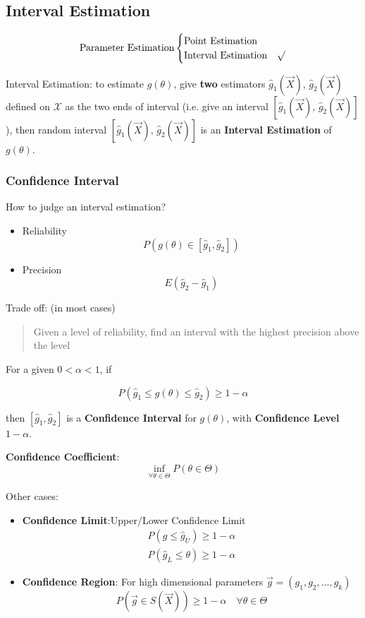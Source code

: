 \subsection{Interval Estimation}\label{SectionIntervalEstimation}
\[
    \text{Parameter Estimation}\begin{cases}
        \text{Point Estimation}& \\
        \text{Interval Estimation}& \surd
    \end{cases}    
\]

    Interval Estimation: to estimate $g(\theta)$, give \textbf{two} estimators $\hat{g}_1(\vec{X}),\, \hat{g}_2(\vec{X})$ defined on $\mathscr{X}$ as the two ends of interval (i.e. give an interval $[\hat{g}_1(\vec{X}),\, \hat{g}_2(\vec{X})]$), then random interval $[\hat{g}_1(\vec{X}),\, \hat{g}_2(\vec{X})]$ is an \textbf{Interval Estimation} of $g(\theta)$.

    \subsubsection{Confidence Interval}\label{SubSectionConfidenceInterval}
    How to judge an interval estimation?
    \begin{itemize}
        \item Reliability
        \[P(g(\theta)\in[\hat{g}_1,\hat{g}_2])\]
        \item Precision
        \[E(\hat{g}_2-\hat{g}_1)\]
    \end{itemize}

    Trade off: (in most cases)
    \begin{quote}
        Given a level of reliability, find an interval with the highest precision above the level
    \end{quote}

\begin{point}
    For a given $0<\alpha<1$, if 
\end{point}

    \[
        P(\hat{g}_1\leq g(\theta)\leq \hat{g}_2)\geq 1-\alpha
    \]

    then $[\hat{g}_1,\hat{g}_2]$ is a \textbf{Confidence Interval} for $g(\theta)$, with \textbf{Confidence Level} $1-\alpha$. 
    
    \textbf{Confidence Coefficient}:
    \[\inf_{\forall\theta\in\Theta}P(
        \theta\in\Theta
    )\]

    Other cases:
    \begin{itemize}[topsep=-4pt]
        \item \textbf{Confidence Limit}:Upper/Lower Confidence Limit
    \begin{align*}
        P(g\leq \hat{g}_U)\geq 1-\alpha\\
        P(\hat{g}_L\leq \theta)\geq 1-\alpha
    \end{align*}
        \item \textbf{Confidence Region}: For high dimensional parameters $\vec{g}=(g_1,g_2,\ldots,g_k)$
        \[P(\vec{g}\in S(\vec{X}))\geq 1-\alpha\quad \forall \theta\in\Theta \]
        
    \end{itemize}

